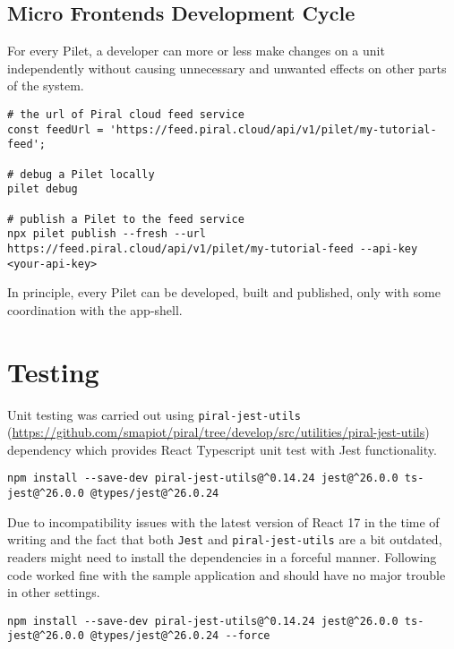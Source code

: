 \documentclass[a4paper]{book}
\begin{document}
\subsection{Micro Frontends Development Cycle}
For every Pilet, a developer can more or less make changes on a unit independently without causing unnecessary and unwanted effects on other parts of the system. 

\begin{lstlisting}[caption={Publishing Pilets \url{https://docs.piral.io/guidelines/tutorials/03-publishing-pilets}}]
# the url of Piral cloud feed service
const feedUrl = 'https://feed.piral.cloud/api/v1/pilet/my-tutorial-feed';

# debug a Pilet locally
pilet debug

# publish a Pilet to the feed service
npx pilet publish --fresh --url https://feed.piral.cloud/api/v1/pilet/my-tutorial-feed --api-key <your-api-key>
\end{lstlisting}

In principle, every Pilet can be developed, built and published, only with some coordination with the app-shell.
\section{Testing}

Unit testing was carried out using \verb|piral-jest-utils| (\url{https://github.com/smapiot/piral/tree/develop/src/utilities/piral-jest-utils}) dependency which provides React Typescript unit test with Jest \cite{Jest} functionality.

\begin{lstlisting}[caption={piral-jest-utils installation with recommended versions}]
  npm install --save-dev piral-jest-utils@^0.14.24 jest@^26.0.0 ts-jest@^26.0.0 @types/jest@^26.0.24
\end{lstlisting}

Due to incompatibility issues with the latest version of React 17 in the time of writing and the fact that both \verb|Jest| and \verb|piral-jest-utils| are a bit outdated, readers might need to install the dependencies in a forceful manner. Following code worked fine with the sample application and should have no major trouble in other settings.

\begin{lstlisting}[caption={piral-jest-utils installation in force mode}]
  npm install --save-dev piral-jest-utils@^0.14.24 jest@^26.0.0 ts-jest@^26.0.0 @types/jest@^26.0.24 --force 
\end{lstlisting}
\end{document}
